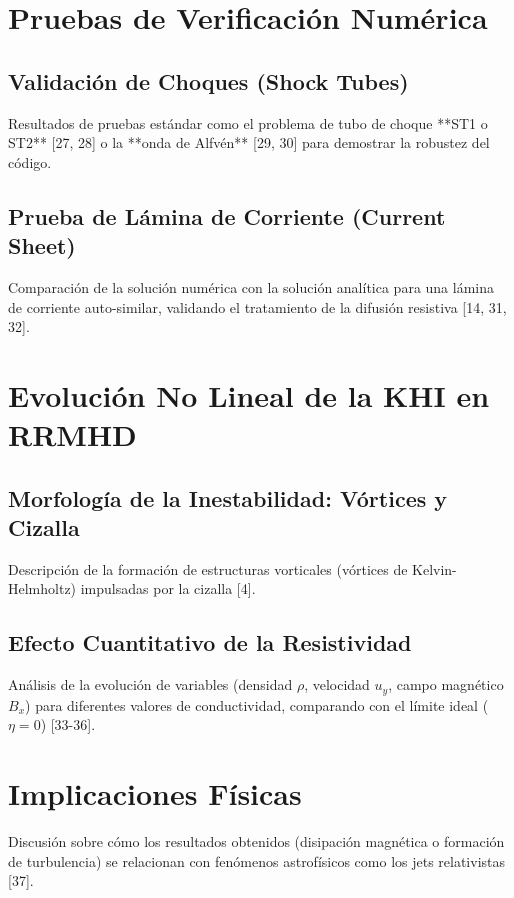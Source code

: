 \section{Pruebas de Verificación Numérica}
    \subsection{Validación de Choques (Shock Tubes)}
        Resultados de pruebas estándar como el problema de tubo de choque **ST1 o ST2** [27, 28] o la **onda de Alfvén** [29, 30] para demostrar la robustez del código.
    \subsection{Prueba de Lámina de Corriente (Current Sheet)}
        Comparación de la solución numérica con la solución analítica para una lámina de corriente auto-similar, validando el tratamiento de la difusión resistiva [14, 31, 32].

\section{Evolución No Lineal de la KHI en RRMHD}
    \subsection{Morfología de la Inestabilidad: Vórtices y Cizalla}
        Descripción de la formación de estructuras vorticales (vórtices de Kelvin-Helmholtz) impulsadas por la cizalla [4].
    \subsection{Efecto Cuantitativo de la Resistividad}
        Análisis de la evolución de variables (densidad $\rho$, velocidad $u_y$, campo magnético $B_x$) para diferentes valores de conductividad, comparando con el límite ideal ($\eta=0$) [33-36].

\section{Implicaciones Físicas}
    Discusión sobre cómo los resultados obtenidos (disipación magnética o formación de turbulencia) se relacionan con fenómenos astrofísicos como los jets relativistas [37].

